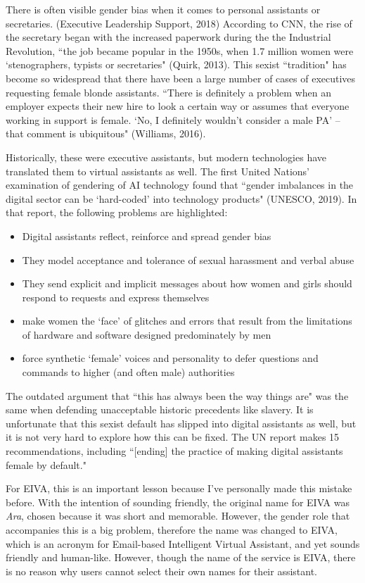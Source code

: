 \documentclass{article}
\begin{document}
There is often visible gender bias when it comes to personal assistants or secretaries. (Executive Leadership Support, 2018) According to CNN, the rise of the secretary began with the increased paperwork during the the Industrial Revolution, ``the job became popular in the 1950s, when 1.7 million women were ‘stenographers, typists or secretaries" (Quirk, 2013). This sexist ``tradition" has become so widespread that there have been a large number of cases of executives requesting female blonde assistants. ``There is definitely a problem when an employer expects their new hire to look a certain way or assumes that everyone working in support is female. `No, I definitely wouldn’t consider a male PA' -- that comment is ubiquitous" (Williams, 2016).

Historically, these were executive assistants, but modern technologies have translated them to virtual assistants as well. The first United Nations' examination of gendering of AI technology found that ``gender imbalances in the digital sector can be ‘hard-coded’ into technology products" (UNESCO, 2019). In that report, the following problems are highlighted:

\begin{itemize}
  \item Digital assistants reflect, reinforce and spread gender bias
  \item They model acceptance and tolerance of sexual harassment and verbal abuse
  \item They send explicit and implicit messages about how women and girls should respond to requests and express themselves
  \item make women the ‘face’ of glitches and errors that result from the limitations of hardware and software designed predominately by men
  \item force synthetic ‘female’ voices and personality to defer questions and commands to higher (and often male) authorities
\end{itemize}

The outdated argument that ``this has always been the way things are" was the same when defending unacceptable historic precedents like slavery. It is unfortunate that this sexist default has slipped into digital assistants as well, but it is not very hard to explore how this can be fixed. The UN report makes 15 recommendations, including ``[ending] the practice of making digital assistants female by default."

For EIVA, this is an important lesson because I've personally made this mistake before. With the intention of sounding friendly, the original name for EIVA was \emph{Ara}, chosen because it was short and memorable. However, the gender role that accompanies this is a big problem, therefore the name was changed to EIVA, which is an acronym for Email-based Intelligent Virtual Assistant, and yet sounds friendly and human-like. However, though the name of the service is EIVA, there is no reason why users cannot select their own names for their assistant.
\end{document}
